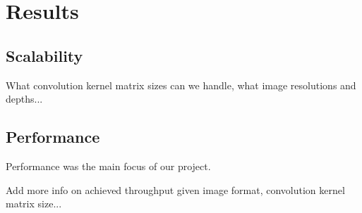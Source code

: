 \section{Results}


\subsection{Scalability}
What convolution kernel matrix sizes can we handle, what image resolutions and depths...

\subsection{Performance}
Performance was the main focus of our project.

Add more info on achieved throughput given image format, convolution kernel matrix size...
